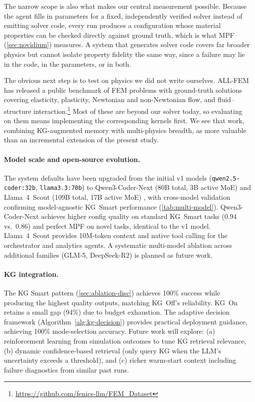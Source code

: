 \documentclass[preprint,review,12pt]{elsarticle}
\newif\ifrevisionsvisible
\newcommand{\revised}[1]{%
  \ifrevisionsvisible\textcolor{revisionred}{#1}\else#1\fi}
\begin{document}
\revised{The narrow scope is also what makes our central measurement
possible.  Because the agent fills in parameters for a fixed,
independently verified solver instead of emitting solver code, every run
produces a configuration whose material properties can be checked
directly against ground truth, which is what MPF (\cref{sec:novidium})
measures.  A system that generates solver code covers far broader physics
but cannot isolate property fidelity the same way, since a failure may
lie in the code, in the parameters, or in both.}

\revised{The obvious next step is to test on physics we did not write
ourselves.  ALL-FEM \citep{deotale2026allfem} has released a public
benchmark of FEM problems with ground-truth solutions covering
elasticity, plasticity, Newtonian and non-Newtonian flow, and
fluid--structure
interaction.\footnote{\url{https://github.com/fenics-llm/FEM_Dataset}}
Most of these are beyond our solver today, so evaluating on them means
implementing the corresponding kernels first.  We see that work,
combining KG-augmented memory with multi-physics breadth, as more
valuable than an incremental extension of the present study.}

\paragraph{Model scale and open-source evolution.}
The system defaults have been upgraded from the initial v1 models
(\texttt{qwen2.5-coder:32b}, \texttt{llama3.3:70b}) to
Qwen3-Coder-Next (80B total, 3B active MoE) \citep{qwen3coder2026}
and Llama~4~Scout (109B total, 17B active MoE) \citep{llama4}, with
cross-model validation confirming model-agnostic KG~Smart performance
(\cref{tab:multi-model}).  Qwen3-Coder-Next achieves higher config
quality on standard KG~Smart tasks (0.94 vs.\ 0.86) and perfect MPF on
novel tasks, identical to the v1 model.  Llama~4~Scout provides 10M-token
context and native tool calling for the orchestrator and analytics agents.
A systematic multi-model ablation across additional families (GLM-5,
DeepSeek-R2) is planned as future work.

\paragraph{KG integration.}
The KG Smart pattern (\cref{sec:ablation-disc}) achieves 100\% success
while producing the highest quality outputs, matching KG~Off's
reliability.  KG~On retains a small gap (94\%) due to budget exhaustion.
The adaptive decision framework (Algorithm~\ref{alg:kg-decision}) provides
practical deployment guidance, achieving 100\% mode-selection accuracy.
Future work will explore:
(a) reinforcement learning from simulation outcomes to tune KG retrieval
relevance, (b) dynamic confidence-based retrieval (only query KG when the
LLM's uncertainty exceeds a threshold), and (c) richer warm-start context
including failure diagnostics from similar past runs.
\end{document}
